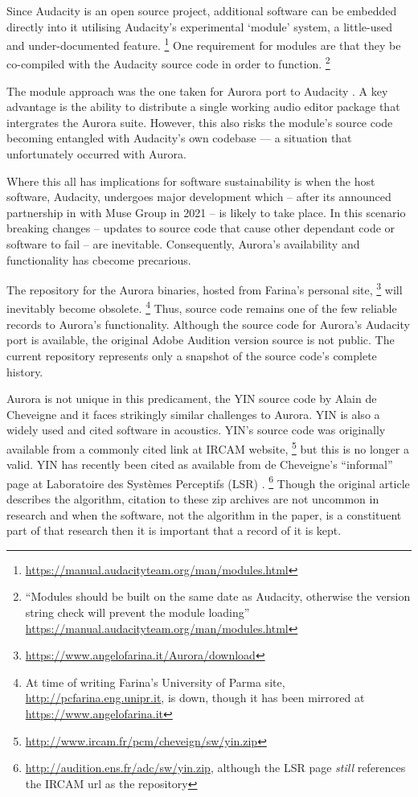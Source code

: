 Since Audacity is an open source project, additional software can be embedded
directly into it utilising Audacity's experimental `module' system, a
little-used and under-documented feature.%
\footnote{\url{https://manual.audacityteam.org/man/modules.html}} One
requirement for modules are that they be co-compiled with the Audacity source
code in order to function.%
\footnote{``Modules should be built on the same date
as Audacity, otherwise the version string check will prevent the module
loading'' \url{https://manual.audacityteam.org/man/modules.html}}

The module approach was the one taken for Aurora port to Audacity
\cite{farina_new_2009}. A key advantage is the ability to distribute a single
working audio editor package that intergrates the Aurora suite. However, this
also risks the module’s source code becoming entangled with Audacity’s own
codebase — a situation that unfortunately occurred with Aurora.

Where this all has implications for software sustainability is when the host
software, Audacity, undergoes major development which -- after its announced
partnership in with Muse Group in 2021 \cite{prokoudine_ultimate_2021} -- is
likely to take place. In this scenario breaking changes -- updates to source
code that cause other dependant code or software to fail -- are inevitable.
Consequently, Aurora’s availability and functionality has cbecome precarious.

The repository for the Aurora binaries, hosted from Farina's personal site,
\footnote{\url{https://www.angelofarina.it/Aurora/download}}
will inevitably become
obsolete.%
\footnote{At time of writing Farina's University of Parma site,
\url{http://pcfarina.eng.unipr.it}, is down, though it has been mirrored at
\url{https://www.angelofarina.it}}
Thus, source code remains one of the few
reliable records to Aurora’s functionality. Although the source code for
Aurora's Audacity port is available, the original Adobe Audition version source
is not public. The current repository represents only a snapshot of the source
code's complete history.

Aurora is not unique in this predicament, the YIN source code by Alain de
Cheveigne \cite{cheveigne_yin_2002} and it faces strikingly similar challenges
to Aurora. YIN is also a widely used and cited software in acoustics. YIN's
source code was originally available from a commonly cited link at IRCAM website,
\footnote{\url{http://www.ircam.fr/pcm/cheveign/sw/yin.zip}}
but this is no longer a
valid. YIN has recently been cited as available from de Cheveigne's ``informal''
page at Laboratoire des Systèmes Perceptifs
(LSR) \cite{alain_cancellation_2023}.%
\footnote{\url{http://audition.ens.fr/adc/sw/yin.zip}, although the LSR page \textit{still} references the IRCAM url as the repository} 
Though the original article describes the algorithm, citation to these zip
archives are not uncommon in research
\cite{banhalmi_fundamental_2005,staudacher_fast_2016} and when the software, not
the algorithm in the paper, is a constituent part of that research then it is
important that a record of it is kept.

